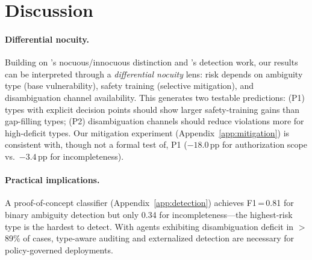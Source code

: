 \section{Discussion}
\label{sec:discussion}

\paragraph{Differential nocuity.}
Building on \citet{berry_kamsties_2004}'s nocuous/innocuous distinction and \citet{willis_nocuous_2008}'s detection work, our results can be interpreted through a \emph{differential nocuity} lens: risk depends on ambiguity type (base vulnerability), safety training (selective mitigation), and disambiguation channel availability. This generates two testable predictions: (P1) types with explicit decision points should show larger safety-training gains than gap-filling types; (P2) disambiguation channels should reduce violations more for high-deficit types. Our mitigation experiment (Appendix~\ref{app:mitigation}) is consistent with, though not a formal test of, P1 ($-18.0$\,pp for authorization scope vs.\ $-3.4$\,pp for incompleteness).

\paragraph{Practical implications.}
A proof-of-concept classifier (Appendix~\ref{app:detection}) achieves F1\,=\,0.81 for binary ambiguity detection but only 0.34 for incompleteness---the highest-risk type is the hardest to detect. With agents exhibiting disambiguation deficit in $>$89\% of cases, type-aware auditing and externalized detection \citep{chantree_2006,ferrari_ambiguity_2019} are necessary for policy-governed deployments.
